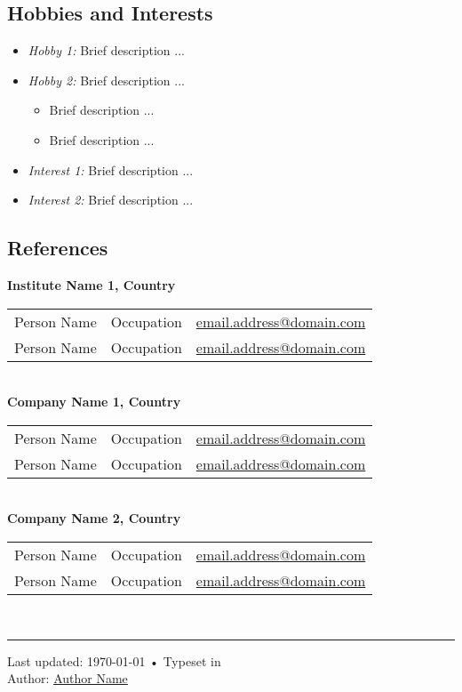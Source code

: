 \documentclass[11pt, a4paper]{article}
\begin{document}
\subsection*{Hobbies and Interests}
\begin{itemize}\addtolength{\itemsep}{-0.5\baselineskip}
\item \textit{Hobby 1:} Brief description ...
\item \textit{Hobby 2:} Brief description ...
\begin{itemize}\addtolength{\itemsep}{-0.5\baselineskip}
\item Brief description ...
\item Brief description ...
\end{itemize}
\item \textit{Interest 1:} Brief description ...
\item \textit{Interest 2:} Brief description ...
\end{itemize}

\dotfill

\subsection*{References}

\textbf{Institute Name 1, Country}\\
\begin{tabular}{lcc}
Person Name&Occupation&\href{mailto:email.address@domain.com}{email.address@domain.com}\\
Person Name&Occupation&\href{mailto:email.address@domain.com}{email.address@domain.com}
\end{tabular}\\

\textbf{Company Name 1, Country}\\
\begin{tabular}{lcc}
Person Name&Occupation&\href{mailto:email.address@domain.com}{email.address@domain.com}\\
Person Name&Occupation&\href{mailto:email.address@domain.com}{email.address@domain.com}
\end{tabular}\\

\textbf{Company Name 2, Country}\\
\begin{tabular}{lcc}
Person Name&Occupation&\href{mailto:email.address@domain.com}{email.address@domain.com}\\
Person Name&Occupation&\href{mailto:email.address@domain.com}{email.address@domain.com}
\end{tabular}\\

\bigskip

\vfill{}
\rule{7in}{0.2pt}

\begin{center}
{\scriptsize  Last updated: \today\- •\- Typeset in \href{http://scripts.sil.org/xetex}{
\XeTeX }\\
Author: \href{http://author.website.com}{Author Name}}
\end{center}
\end{document}
